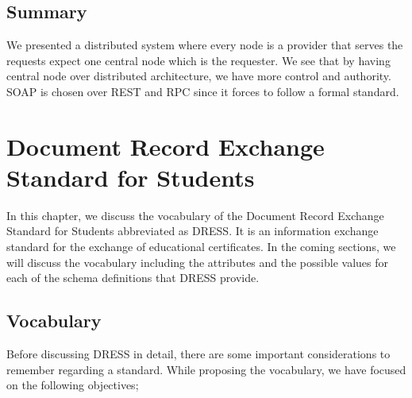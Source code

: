 \documentclass[12pt,a4paper,oneside]{book}
\begin{document}
\section{Summary}
We presented a distributed system where every node is a provider that serves the requests expect one central node which is the requester. We see that by having central node over distributed architecture, we have more control and authority. SOAP is chosen over REST and RPC since it forces to follow a formal standard.


\chapter{Document Record Exchange Standard for Students }\label{ch-DRESS}

In this chapter, we discuss the vocabulary of the Document Record Exchange Standard for Students abbreviated as DRESS. It is an information exchange standard for the exchange of educational certificates.  
In the coming sections, we will discuss the vocabulary including the attributes and the possible values for each of the schema definitions that DRESS provide.
  




\section{Vocabulary}

Before discussing DRESS in detail, there are some important considerations to remember regarding a standard. While proposing the vocabulary, we have focused on the following objectives;
\end{document}
